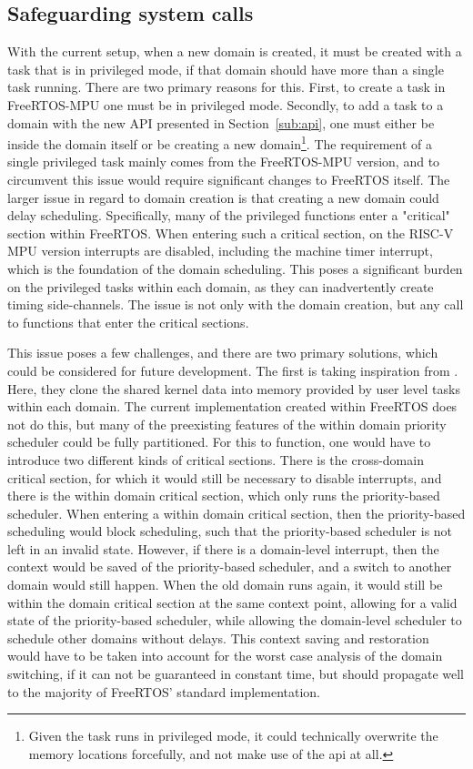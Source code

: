 \subsection{Safeguarding system calls}\label{sub:safeguard-syscalls}
With the current setup, when a new domain is created, it must be created with a
task that is in privileged mode, if that domain should have more than a single
task running. There are two primary reasons for this. First, to create a task
in FreeRTOS-MPU one must be in privileged mode. Secondly, to add a task to a
domain with the new API presented in Section~\ref{sub:api}, one must either be
inside the domain itself or be creating a new domain\footnote{Given the task
  runs in privileged mode, it could technically overwrite the memory locations
forcefully, and not make use of the api at all.}. The requirement of a single
privileged task mainly comes from the FreeRTOS-MPU version, and to circumvent
this issue would require significant changes to FreeRTOS itself. The larger
issue in regard to domain creation is that creating a new domain could delay
scheduling. Specifically, many of the privileged functions enter a "critical"
section within FreeRTOS. When entering such a critical section, on the RISC-V
MPU version interrupts are disabled, including the machine timer interrupt,
which is the foundation of the domain scheduling. This poses a significant
burden on the privileged tasks within each domain, as they can inadvertently
create timing side-channels. The issue is not only with the domain creation,
but any call to functions that enter the critical sections. 

This issue poses a few challenges, and there are two primary solutions, which
could be considered for future development. The first is taking inspiration
from \cite{ge2019}. Here, they clone the shared kernel data into memory
provided by user level tasks within each domain. The current implementation
created within FreeRTOS does not do this, but many of the preexisting features
of the within domain priority scheduler could be fully partitioned. For this to
function, one would have to introduce two different kinds of critical sections.
There is the cross-domain critical section, for which it would still be
necessary to disable interrupts, and there is the within domain critical
section, which only runs the priority-based scheduler. When entering a within
domain critical section, then the priority-based scheduling would block
scheduling, such that the priority-based scheduler is not left in an invalid
state. However, if there is a domain-level interrupt, then the context would be
saved of the priority-based scheduler, and a switch to another domain would
still happen. When the old domain runs again, it would still be within the
domain critical section at the same context point, allowing for a valid state
of the priority-based scheduler, while allowing the domain-level scheduler to
schedule other domains without delays. This context saving and restoration
would have to be taken into account for the worst case analysis of the domain
switching, if it can not be guaranteed in constant time, but should propagate
well to the majority of FreeRTOS' standard implementation.

